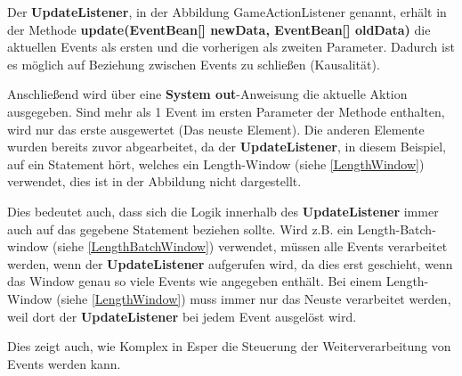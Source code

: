 Der \textbf{UpdateListener}, in der Abbildung GameActionListener genannt, erhält in der Methode \textbf{update(EventBean[] newData, EventBean[] oldData)} die aktuellen Events als ersten und die vorherigen als zweiten Parameter. Dadurch ist es möglich auf Beziehung zwischen Events zu schließen (Kausalität).

Anschließend wird über eine \textbf{System out}-Anweisung die aktuelle Aktion ausgegeben. Sind mehr als 1 Event im ersten Parameter der Methode enthalten, wird nur das erste ausgewertet (Das neuste Element). Die anderen Elemente wurden bereits zuvor abgearbeitet, da der \textbf{UpdateListener}, in diesem Beispiel, auf ein Statement hört, welches ein Length-Window (siehe \ref{LengthWindow}) verwendet, dies ist in der Abbildung nicht dargestellt.

Dies bedeutet auch, dass sich die Logik innerhalb des \textbf{UpdateListener} immer auch auf das gegebene Statement beziehen sollte. Wird z.B. ein Length-Batch-window (siehe \ref{LengthBatchWindow}) verwendet, müssen alle Events verarbeitet werden, wenn der \textbf{UpdateListener} aufgerufen wird, da dies erst geschieht, wenn das Window genau so viele Events wie angegeben enthält. Bei einem Length-Window (siehe \ref{LengthWindow}) muss immer nur das Neuste verarbeitet werden, weil dort der \textbf{UpdateListener} bei jedem Event ausgelöst wird. 

Dies zeigt auch, wie Komplex in Esper die Steuerung der Weiterverarbeitung von Events werden kann. 